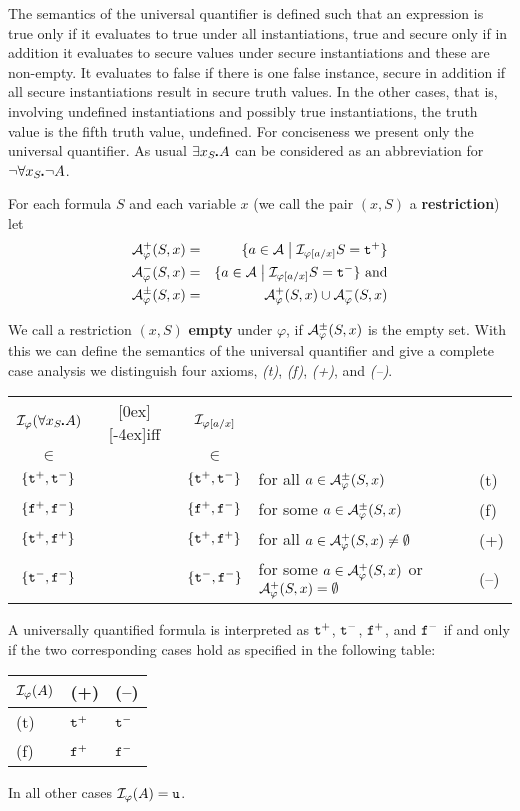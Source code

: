 \documentclass{\filespath jancl}
\def\setdivider{\;\bigl|\;}
\def\phi{\varphi}
\def\cA{{\cal A}}\def\cB{{\cal B}}\def\cC{{\cal C}}
\def\sdot{\rule{.3ex}{.3ex}\hspace{-0.4ex}\;} %
\let\phi\varphi
\newcommand{\twts}{{{\sf t}^+}}
\newcommand{\twfs}{{{\sf f}^+}}
\newcommand{\twti}{{{\sf t}^-}}
\newcommand{\twfi}{{{\sf f}^-}}
\newcommand{\twu}{{\sf u}}
\newcommand{\set}[1]{\left\{#1\right\}}
\def\sf{\tt}
\begin{document}
The semantics of the universal quantifier is defined such that an
expression is true only if it evaluates to true under all
instantiations, true and secure only if in addition it evaluates to
secure values under secure instantiations and these are non-empty.  It
evaluates to false if there is one false instance, secure in addition
if all secure instantiations result in secure truth values. In the
other cases, that is, involving undefined instantiations and possibly
true instantiations, the truth value is the fifth truth value,
undefined. For conciseness we present only the universal
quantifier. As usual $\exists x_S\sdot A$ can be considered as an
abbreviation for $\non\forall x_S\sdot\non A$.
\begin{definition}\label{Def:quantifiers}    
For each formula $S$ and each variable $x$ (we call the pair $(x,S)$ a {\bf
  restriction}) let
\begin{eqnarray*}
\cA^+_\phi(S,x)   & = & \{a\in\cA\setdivider\cI_{\phi[a/x]}S=\twts\}\\
\cA^-_\phi(S,x)   & = & \{a\in\cA\setdivider\cI_{\phi[a/x]}S=\twti\}{\rm\ and}\\
\cA^\pm_\phi(S,x) & = & \cA^+_\phi(S,x)\cup\cA^-_\phi(S,x)
\end{eqnarray*}

We call a restriction $(x,S)$ {\bf empty} under $\phi$, if
$\cA^\pm_\phi(S,x)$ is the empty set.  With this we can define the
semantics of the universal quantifier and give a complete case
analysis we distinguish four axioms, \textit{(t)}, \textit{(f)}, \textit{(+)}, and \textit{(--)}.

\begin{tabular}{cccll}
$\cI_\phi(\forall x_S\sdot A)$ & \raisebox{-2ex}[0ex][-4ex]{iff} & $\cI_{\phi[a/x]}$\\
$\in$                        &     & $\in$\\\hline
$\set{\twts,\twti}$ &  &$\set{\twts,\twti}$ & for all
   $a\in\cA^\pm_\phi(S,x)$ & (t)\\

$\set{\twfs,\twfi}$ & & $\set{\twfs,\twfi}$ & for
  some $a\in\cA^\pm_\phi(S,x)$ & (f)\\

$\set{\twts,\twfs}$ &  & $\set{\twts,\twfs}$ & for all
   $a\in\cA^+_\phi(S,x)\not=\emptyset$ & (+)\\
 $\set{\twti,\twfi}$ &  & $\set{\twti,\twfi}$ & for some
   $a\in\cA^+_\phi(S,x)$ or $\cA^+_\phi(S,x)=\emptyset$ & (--)
 \end{tabular}

A universally quantified formula is interpreted as $\twts$, $\twti$,
$\twfs$, and $\twfi$ if and only
if the two corresponding cases hold as
specified in the following table:\\
\begin{tabular}{l|ll}
$\cI_\phi(A)$ & (+) & (--) \\\hline
(t)         & $\twts$ & $\twti$\\
(f)         & $\twfs$ & $\twfi$
\end{tabular}

In all other cases $\cI_\phi(A) = \twu$.
\end{definition}
\end{document}

